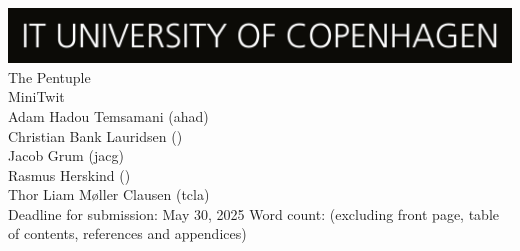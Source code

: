 \begin{titlepage}      
    \begin{center}
        \includegraphics[width=\textwidth]{images/ITU_logo.jpg}\\[1.5cm]
      
        \huge {             
            The Pentuple \\ MiniTwit
        }\\
        \vspace{2cm}
        {\Large
            Adam Hadou Temsamani (ahad) 
        }\\
        {\Large
            Christian Bank Lauridsen ()
        }\\
        {\Large
            Jacob Grum (jacg) 
        }\\
        {\Large
            Rasmus Herskind ()  
        }\\
        {\Large
            Thor Liam Møller Clausen (tcla)  
        }\\
        \vspace{2cm}
        {\Large
            Deadline for submission: May 30, 2025
        } 
        \vspace{2cm} 
        {\large Word count: \theword (excluding front page, table of contents, references and appendices) } 
    \end{center} 
\end{titlepage}